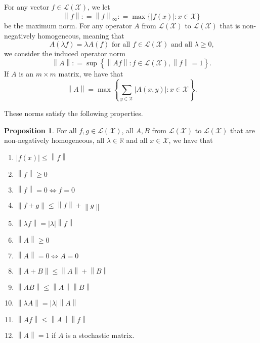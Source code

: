 \documentclass[10pt]{paper}
\theoremstyle{definition}
\newtheorem{proposition}[theorem]{Proposition}
\newcommand{\reals}{\mathbb{R}}
\newcommand{\states}{\mathcal{X}}
\newcommand{\gambles}{\mathcal{L}}
\newcommand{\gamblesX}{\gambles(\states)}
\newcommand{\asa}{\Leftrightarrow}
\newcommand{\norm}[1]{\left\lVert #1 \right\rVert}
\newcommand{\abs}[1]{\left\vert #1 \right\vert}
\newcommand{\coloneqq}{:\!=}
\begin{document}
For any vector $f\in\gamblesX$, we let
\begin{equation*}
\norm{f}\coloneqq\norm{f}_{\infty}\coloneqq\max\{\abs {f(x)}\colon x\in\states\}
\end{equation*}
be the maximum norm. For any operator $A$ from $\gamblesX$ to $\gamblesX$ that is non-negatively homogeneous, meaning that
\begin{equation*}
A(\lambda f)=\lambda A(f)\text{ for all $f\in\gamblesX$ and all $\lambda\geq0$,}
\end{equation*}
we consider the induced operator norm
\begin{equation*}
\norm{A}\coloneqq\sup\left\{\norm{Af}\colon f\in\gamblesX,\norm{f}=1\right\}.
\end{equation*}
If $A$ is an $m\times m$ matrix, we have that
\begin{equation*}
\norm{A}
=
\max\left\{\sum_{y\in\states}\abs{A(x,y)}\colon x\in\states\right\}.
\end{equation*}

\noindent
These norms satisfy the following properties. 

\begin{proposition}
For all $f,g\in\gamblesX$, all $A,B$ from $\gamblesX$ to $\gamblesX$ that are non-negatively homogeneous, all $\lambda\in\reals$ and all $x\in\states$, we have that
\vspace{5pt}

\begin{enumerate}[label=N\arabic*:,ref=N\arabic*]
\item
$\abs{f(x)}\leq\norm{f}$
\item
$\norm{f}\geq0$
\item
$\norm{f}=0\asa f=0$
\item
$\norm{f+g}\leq\norm{f}+\norm{g}$
\item
$\norm{\lambda f}=\abs{\lambda}\norm{f}$
\item
$\norm{A}\geq0$
\item
$\norm{A}=0\asa A=0$
\item
$\norm{A+B}\leq\norm{A}+\norm{B}$
\item
$\norm{AB}\leq\norm{A}\norm{B}$
\item
$\norm{\lambda A}=\abs{\lambda}\norm{A}$
\item\label{N:normAf}
$\norm{Af}\leq\norm{A}\norm{f}$
\item
$\norm{A}=1$ if $A$ is a stochastic matrix.
\end{enumerate}
\vspace{5pt}
\end{proposition}
\end{document}
